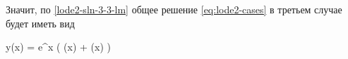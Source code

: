 Значит, по \ref{lode2-sln-3-3-lm} общее решение \eqref{eq:lode2-cases} в третьем
случае будет иметь вид

\begin{lequation}{}
  y(x) = e^{\alpha x} \Big(
     \cos (\beta x) +
     \sin (\beta x)
  \Big)
\end{lequation}




